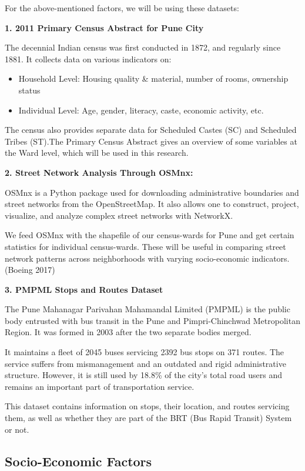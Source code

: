 \documentclass[
]{article}
\providecommand{\tightlist}{%
  \setlength{\itemsep}{0pt}\setlength{\parskip}{0pt}}
\begin{document}
For the above-mentioned factors, we will be using these datasets:

\textbf{1. 2011 Primary Census Abstract for Pune City}

The decennial Indian census was first conducted in 1872, and regularly
since 1881. It collects data on various indicators on:

\begin{itemize}
\tightlist
\item
  Household Level: Housing quality \& material, number of rooms,
  ownership status
\item
  Individual Level: Age, gender, literacy, caste, economic activity,
  etc.
\end{itemize}

The census also provides separate data for Scheduled Castes (SC) and
Scheduled Tribes (ST).The Primary Census Abstract gives an overview of
some variables at the Ward level, which will be used in this research.

\textbf{2. Street Network Analysis Through OSMnx:}

OSMnx is a Python package used for downloading administrative boundaries
and street networks from the OpenStreetMap. It also allows one to
construct, project, visualize, and analyze complex street networks with
NetworkX.

We feed OSMnx with the shapefile of our census-wards for Pune and get
certain statistics for individual census-wards. These will be useful in
comparing street network patterns across neighborhoods with varying
socio-economic indicators. (Boeing 2017)

\textbf{3. PMPML Stops and Routes Dataset}

The Pune Mahanagar Parivahan Mahamandal Limited (PMPML) is the public
body entrusted with bus transit in the Pune and Pimpri-Chinchwad
Metropolitan Region. It was formed in 2003 after the two separate bodies
merged.

It maintains a fleet of 2045 buses servicing 2392 bus stops on 371
routes. The service suffers from mismanagement and an outdated and rigid
administrative structure. However, it is still used by 18.8\% of the
city's total road users and remains an important part of transportation
service.

This dataset contains information on stops, their location, and routes
servicing them, as well as whether they are part of the BRT (Bus Rapid
Transit) System or not.

\hypertarget{socio-economic-factors}{%
\subsection{Socio-Economic Factors}\label{socio-economic-factors}}
\end{document}
